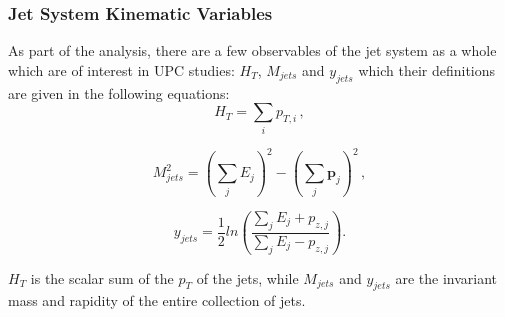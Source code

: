 \subsubsection{Jet System Kinematic Variables}
As part of the analysis, there are a few observables of the jet system as a whole which are of interest in UPC studies: $H_T$, $M_{jets}$ and $y_{jets}$ which their definitions are given in the following equations: 
\begin{equation}
	H_{T} = \sum_{i} p_{T,i} \,,
\end{equation}  
	
\begin{equation}
	M_{jets}^2  = \left(\sum_j E_j\right)^2 - \left(\sum_j \mathbf{p}_j\right)^2 \,,
\end{equation}

\begin{equation}
	y_{jets} = \frac{1}{2}ln\left(\frac{\sum_j E_j +p_{z,j}}{\sum_j E_j -p_{z,j}}\right).
\end{equation}

$H_T$ is the scalar sum of the $p_T$ of the jets, while $M_{jets}$ and $y_{jets}$ are the invariant mass and rapidity of the entire collection of jets.



